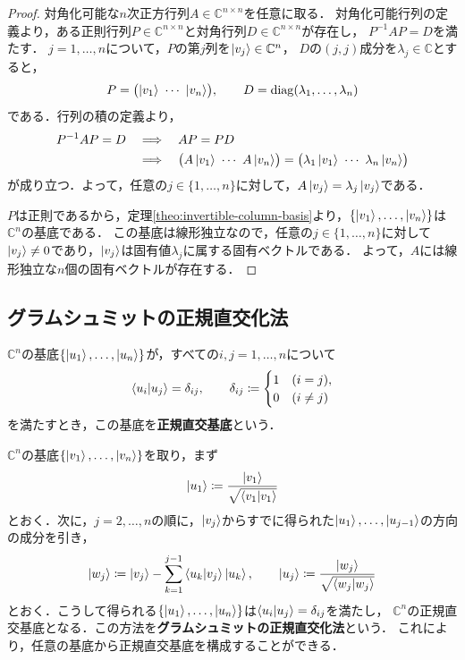 \begin{proof}
  対角化可能な$n$次正方行列$A\in\mathbb C^{n\times n}$を任意に取る．
  対角化可能行列の定義より，ある正則行列$P\in\mathbb C^{n\times n}$と対角行列$D\in\mathbb C^{n\times n}$が存在し，
  $P^{-1}AP=D$を満たす．
  $j=1,\ldots,n$について，$P$の第$j$列を$\ket{v_j}\in\mathbb C^n$，
  $D$の$(j,j)$成分を$\lambda_j\in\mathbb C$とすると，
  \begin{equation*}
    P=\bigl(\ket{v_1}\ \cdots\ \ket{v_n}\bigr),
    \qquad D=\operatorname{diag}(\lambda_1,\ldots,\lambda_n)
  \end{equation*}
  である．行列の積の定義より，
  \begin{align*}
    P^{-1}AP=D
    &\quad\Longrightarrow\quad AP=PD\\
    &\quad\Longrightarrow\quad
      \bigl(A\ket{v_1}\ \cdots\ A\ket{v_n}\bigr)
      =\bigl(\lambda_1\ket{v_1}\ \cdots\ \lambda_n\ket{v_n}\bigr)
  \end{align*}
  が成り立つ．よって，任意の$j\in\{1,\ldots,n\}$に対して，$A\ket{v_j}=\lambda_j\ket{v_j}$である．

  $P$は正則であるから，定理\ref{theo:invertible-column-basis}より，$\{\ket{v_1},\ldots,\ket{v_n}\}$は$\mathbb C^n$の基底である．
  この基底は線形独立なので，任意の$j\in\{1,\ldots,n\}$に対して$\ket{v_j}\ne0$であり，$\ket{v_j}$は固有値$\lambda_j$に属する固有ベクトルである．
  よって，$A$には線形独立な$n$個の固有ベクトルが存在する．
\end{proof}

\subsection{グラムシュミットの正規直交化法}

\begin{defi}[正規直交基底]
  $\mathbb C^n$の基底$\{\ket{u_1},\ldots,\ket{u_n}\}$が，すべての$i,j=1,\ldots,n$について
  \begin{equation*}
    \braket{u_i|u_j}=\delta_{ij},
    \qquad
    \delta_{ij}\coloneq
    \begin{cases}
      1 & (i=j),\\
      0 & (i\ne j)
    \end{cases}
  \end{equation*}
  を満たすとき，この基底を\textbf{正規直交基底}という．
\end{defi}

$\mathbb C^n$の基底$\{\ket{v_1},\ldots,\ket{v_n}\}$を取り，まず
\begin{equation*}
  \ket{u_1}\coloneq\frac{\ket{v_1}}{\sqrt{\braket{v_1|v_1}}}
\end{equation*}
とおく．次に，$j=2,\ldots,n$の順に，$\ket{v_j}$からすでに得られた$\ket{u_1},\ldots,\ket{u_{j-1}}$の方向の成分を引き，
\begin{equation*}
  \ket{w_j}\coloneq\ket{v_j}-\sum_{k=1}^{j-1}\braket{u_k|v_j}\ket{u_k},
  \qquad \ket{u_j}\coloneq\frac{\ket{w_j}}{\sqrt{\braket{w_j|w_j}}}
\end{equation*}
とおく．こうして得られる$\{\ket{u_1},\ldots,\ket{u_n}\}$は$\braket{u_i|u_j}=\delta_{ij}$を満たし，
$\mathbb C^n$の正規直交基底となる．この方法を\textbf{グラムシュミットの正規直交化法}という．
これにより，任意の基底から正規直交基底を構成することができる．

